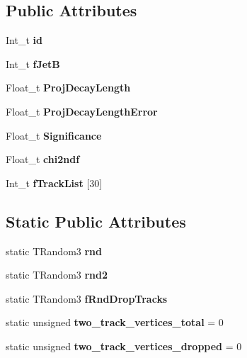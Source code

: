 \subsection*{Public Attributes}
\begin{CompactItemize}
\item 
Int\_\-t \textbf{id}\label{classTVertex_805f605f178abc261140709e3e6f770f}

\item 
Int\_\-t \textbf{f\-Jet\-B}\label{classTVertex_4fb81914f7d6bcdab3f67639ee775155}

\item 
Float\_\-t \textbf{Proj\-Decay\-Length}\label{classTVertex_b2549b160cb26f10fc82f25255eb657c}

\item 
Float\_\-t \textbf{Proj\-Decay\-Length\-Error}\label{classTVertex_2728aa1a4ff5a57a76625b3f5dce89a4}

\item 
Float\_\-t \textbf{Significance}\label{classTVertex_0db0fea7037cd98ae235547a0207ffd9}

\item 
Float\_\-t \textbf{chi2ndf}\label{classTVertex_271dac30c657c4610c65a0b309461239}

\item 
Int\_\-t \textbf{f\-Track\-List} [30]\label{classTVertex_1e59075d9a7e15afec83aad023ad63ce}

\end{CompactItemize}
\subsection*{Static Public Attributes}
\begin{CompactItemize}
\item 
static TRandom3 \textbf{rnd}\label{classTVertex_ba84d3452d6ae677fa3959873eb03026}

\item 
static TRandom3 \textbf{rnd2}\label{classTVertex_bebc378ecb14016346b3fed32854f50b}

\item 
static TRandom3 \textbf{f\-Rnd\-Drop\-Tracks}\label{classTVertex_618b3a02f8f5fdd447577f84e03cd0e9}

\item 
static unsigned \textbf{two\_\-track\_\-vertices\_\-total} = 0\label{classTVertex_32f6b18733f286a647b43b967c13c066}

\item 
static unsigned \textbf{two\_\-track\_\-vertices\_\-dropped} = 0\label{classTVertex_74f1a12bed36ce992a0c8c68404620a7}

\end{CompactItemize}
